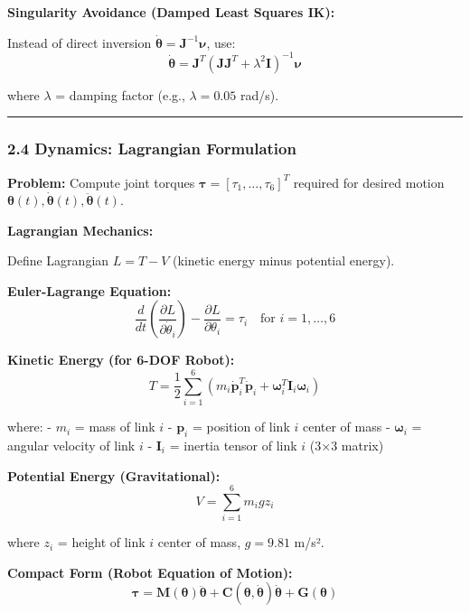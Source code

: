 \documentclass[
]{article}
\begin{document}
\textbf{Singularity Avoidance (Damped Least Squares IK):}

Instead of direct inversion
\(\dot{\boldsymbol{\theta}} = \mathbf{J}^{-1} \boldsymbol{\nu}\), use:
\[
\dot{\boldsymbol{\theta}} = \mathbf{J}^T (\mathbf{J} \mathbf{J}^T + \lambda^2 \mathbf{I})^{-1} \boldsymbol{\nu}
\]

where \(\lambda\) = damping factor (e.g., \(\lambda = 0.05\) rad/s).

\begin{center}\rule{0.5\linewidth}{0.5pt}\end{center}

\hypertarget{dynamics-lagrangian-formulation}{%
\subsubsection{2.4 Dynamics: Lagrangian
Formulation}\label{dynamics-lagrangian-formulation}}

\textbf{Problem:} Compute joint torques
\(\boldsymbol{\tau} = [\tau_1, \ldots, \tau_6]^T\) required for desired
motion
\(\boldsymbol{\theta}(t), \dot{\boldsymbol{\theta}}(t), \ddot{\boldsymbol{\theta}}(t)\).

\textbf{Lagrangian Mechanics:}

Define Lagrangian \(L = T - V\) (kinetic energy minus potential energy).

\textbf{Euler-Lagrange Equation:} \[
\frac{d}{dt} \left( \frac{\partial L}{\partial \dot{\theta}_i} \right) - \frac{\partial L}{\partial \theta_i} = \tau_i \quad \text{for } i = 1, \ldots, 6
\]

\textbf{Kinetic Energy (for 6-DOF Robot):} \[
T = \frac{1}{2} \sum_{i=1}^6 \left( m_i \dot{\mathbf{p}}_i^T \dot{\mathbf{p}}_i + \boldsymbol{\omega}_i^T \mathbf{I}_i \boldsymbol{\omega}_i \right)
\]

where: - \(m_i\) = mass of link \(i\) - \(\mathbf{p}_i\) = position of
link \(i\) center of mass - \(\boldsymbol{\omega}_i\) = angular velocity
of link \(i\) - \(\mathbf{I}_i\) = inertia tensor of link \(i\) (3×3
matrix)

\textbf{Potential Energy (Gravitational):} \[
V = \sum_{i=1}^6 m_i g z_i
\]

where \(z_i\) = height of link \(i\) center of mass, \(g = 9.81\) m/s².

\textbf{Compact Form (Robot Equation of Motion):} \[
\boldsymbol{\tau} = \mathbf{M}(\boldsymbol{\theta}) \ddot{\boldsymbol{\theta}} + \mathbf{C}(\boldsymbol{\theta}, \dot{\boldsymbol{\theta}}) \dot{\boldsymbol{\theta}} + \mathbf{G}(\boldsymbol{\theta})
\]
\end{document}
